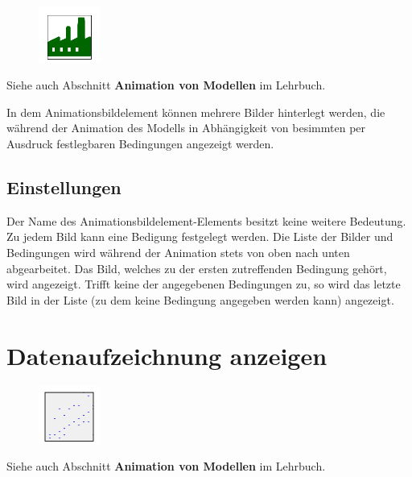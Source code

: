 \begin{figure}
\vspace{-22pt}
\includegraphics[width=2cm]{imageModelElementAnimationImage.png}
\vspace{-22pt}
\end{figure}

Siehe auch Abschnitt \textbf{Animation von Modellen} im Lehrbuch.

In dem Animationsbildelement können mehrere Bilder hinterlegt werden, die während der
Animation des Modells in Abhängigkeit von besimmten per Ausdruck festlegbaren
Bedingungen angezeigt werden.

\subsection*{Einstellungen}

Der Name des Animationsbildelement-Elements besitzt keine weitere Bedeutung. 
Zu jedem Bild kann eine Bedigung festgelegt werden. Die Liste der Bilder und
Bedingungen wird während der Animation stets von oben nach unten abgearbeitet.
Das Bild, welches zu der ersten zutreffenden Bedingung gehört, wird angezeigt.
Trifft keine der angegebenen Bedingungen zu, so wird das letzte Bild in der
Liste (zu dem keine Bedingung angegeben werden kann) angezeigt.


\section{Datenaufzeichnung anzeigen}
\label{ref:ModelElementAnimationRecord}

\begin{figure}
\vspace{-22pt}
\includegraphics[width=2cm]{imageModelElementAnimationRecord.png}
\vspace{-22pt}
\end{figure}

Siehe auch Abschnitt \textbf{Animation von Modellen} im Lehrbuch.

